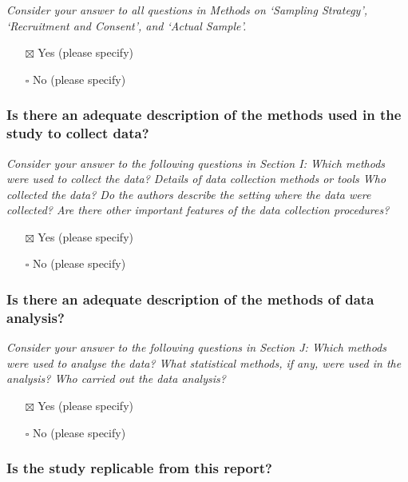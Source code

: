 \documentclass[
  doc, a4paper]{apa7}
\providecommand{\tightlist}{%
  \setlength{\itemsep}{0pt}\setlength{\parskip}{0pt}}
\begin{document}
\emph{Consider your answer to all questions in Methods on `Sampling Strategy', `Recruitment and Consent', and `Actual Sample'.}

\begin{itemize}
\tightlist
\item[$\boxtimes$]
  Yes (please specify)
\item[$\square$]
  No (please specify)
\end{itemize}

\subsubsection{Is there an adequate description of the methods used in the study to collect data?}\label{is-there-an-adequate-description-of-the-methods-used-in-the-study-to-collect-data}

\emph{Consider your answer to the following questions in Section I: Which methods were used to collect the data? Details of data collection methods or tools Who collected the data? Do the authors describe the setting where the data were collected? Are there other important features of the data collection procedures?}

\begin{itemize}
\tightlist
\item[$\boxtimes$]
  Yes (please specify)
\item[$\square$]
  No (please specify)
\end{itemize}

\subsubsection{Is there an adequate description of the methods of data analysis?}\label{is-there-an-adequate-description-of-the-methods-of-data-analysis}

\emph{Consider your answer to the following questions in Section J: Which methods were used to analyse the data? What statistical methods, if any, were used in the analysis? Who carried out the data analysis?}

\begin{itemize}
\tightlist
\item[$\boxtimes$]
  Yes (please specify)
\item[$\square$]
  No (please specify)
\end{itemize}

\subsubsection{Is the study replicable from this report?}\label{is-the-study-replicable-from-this-report}
\end{document}
